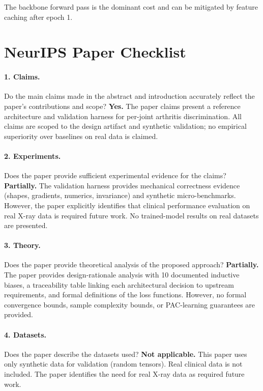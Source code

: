 \documentclass{article}
\begin{document}
The backbone forward pass is the dominant cost and can be mitigated by feature caching after epoch 1.

\newpage
\section*{NeurIPS Paper Checklist}

\paragraph{1. Claims.}
Do the main claims made in the abstract and introduction accurately reflect the paper's contributions and scope?
\textbf{Yes.} The paper claims present a reference architecture and validation harness for per-joint arthritis discrimination. All claims are scoped to the design artifact and synthetic validation; no empirical superiority over baselines on real data is claimed.

\paragraph{2. Experiments.}
Does the paper provide sufficient experimental evidence for the claims?
\textbf{Partially.} The validation harness provides mechanical correctness evidence (shapes, gradients, numerics, invariance) and synthetic micro-benchmarks. However, the paper explicitly identifies that clinical performance evaluation on real X-ray data is required future work. No trained-model results on real datasets are presented.

\paragraph{3. Theory.}
Does the paper provide theoretical analysis of the proposed approach?
\textbf{Partially.} The paper provides design-rationale analysis with 10 documented inductive biases, a traceability table linking each architectural decision to upstream requirements, and formal definitions of the loss functions. However, no formal convergence bounds, sample complexity bounds, or PAC-learning guarantees are provided.

\paragraph{4. Datasets.}
Does the paper describe the datasets used?
\textbf{Not applicable.} This paper uses only synthetic data for validation (random tensors). Real clinical data is not included. The paper identifies the need for real X-ray data as required future work.
\end{document}

